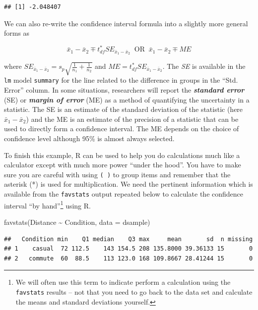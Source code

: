 \documentclass[
]{book}
\newenvironment{Shaded}{\begin{snugshade}}{\end{snugshade}}
\newcommand{\AttributeTok}[1]{\textcolor[rgb]{0.77,0.63,0.00}{#1}}
\newcommand{\FunctionTok}[1]{\textcolor[rgb]{0.00,0.00,0.00}{#1}}
\newcommand{\NormalTok}[1]{#1}
\newcommand{\SpecialCharTok}[1]{\textcolor[rgb]{0.00,0.00,0.00}{#1}}
\begin{document}
\begin{verbatim}
## [1] -2.048407
\end{verbatim}

We can also re-write the confidence interval formula into a slightly more
general forms as

\[\bar{x}_1 - \bar{x}_2 \mp t^*_{df}SE_{\bar{x}_1 - \bar{x}_2}\ \text{ OR }\ 
\bar{x}_1 - \bar{x}_2 \mp ME\]

where \(SE_{\bar{x}_1 - \bar{x}_2} = s_p\sqrt{\frac{1}{n_1}+\frac{1}{n_2}}\) and
\(ME = t^*_{df}SE_{\bar{x}_1 - \bar{x}_2}\). The \emph{SE} is available in the \texttt{lm} model \texttt{summary} for the line related to the difference in groups in the ``Std. Error'' column. In some situations, researchers will
report the \textbf{\emph{standard error}} (SE) or \textbf{\emph{margin of error}} (ME) as a method
of quantifying the uncertainty in a statistic. The SE is an estimate of the
standard deviation of the statistic (here \(\bar{x}_1 - \bar{x}_2\)) and the ME
is an estimate of the precision of a statistic that can be used to directly
form a confidence interval. The ME depends on the choice of confidence level
although 95\% is almost always selected.

\indent To finish this example, R can be used to help you do calculations much
like a calculator except with much more power ``under the hood''. You have to
make sure you are careful with using \texttt{(\ )} to group items and remember that
the asterisk (*) is used for multiplication. We need the pertinent
information which is available from the \texttt{favstats} output repeated below to
calculate the confidence interval ``by hand''\footnote{We will often use this term to
  indicate perform a calculation using the \texttt{favstats} results -- not that you need to go back to
  the data set and calculate the means and standard deviations yourself.} using R.

\begin{Shaded}
\begin{Highlighting}[]
\FunctionTok{favstats}\NormalTok{(Distance }\SpecialCharTok{\textasciitilde{}}\NormalTok{ Condition, }\AttributeTok{data =}\NormalTok{ dsample)}
\end{Highlighting}
\end{Shaded}

\begin{verbatim}
##   Condition min    Q1 median    Q3 max     mean       sd  n missing
## 1    casual  72 112.5    143 154.5 208 135.8000 39.36133 15       0
## 2   commute  60  88.5    113 123.0 168 109.8667 28.41244 15       0
\end{verbatim}
\end{document}
